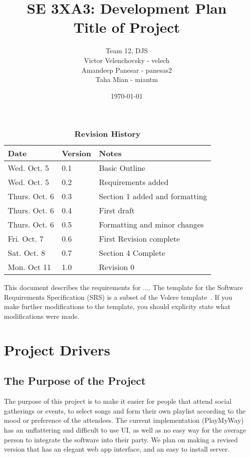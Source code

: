 \documentclass[12pt, titlepage]{article}
\title{SE 3XA3: Development Plan\\Title of Project}
\author{Team 12, DJS
	\\ Victor Velenchovsky - velech
	\\ Amandeep Panesar - panesas2
	\\ Taha Mian - miantm
}
\date{\today}
\begin{document}
\maketitle

\tableofcontents
\listoftables
\listoffigures

\begin{table}[bp]
\caption{\bf Revision History}
\begin{tabularx}{\textwidth}{p{3cm}p{2cm}X}
\toprule {\bf Date} & {\bf Version} & {\bf Notes}\\
\midrule
Wed. Oct. 5 & 0.1 & Basic Outline \\
Wed. Oct. 5 & 0.2 & Requirements added \\
Thurs. Oct. 6 & 0.3 & Section 1 added and formatting \\
Thurs. Oct. 6 & 0.4 & First draft \\
Thurs. Oct. 6 & 0.5 & Formatting and minor changes \\
Fri. Oct. 7 & 0.6 & First Revision complete \\
Sat. Oct. 8 & 0.7 & Section 4 Complete\\
Mon. Oct 11 & 1.0 & Revision 0\\
\bottomrule
\end{tabularx}
\end{table}

\newpage


This document describes the requirements for ....  The template for the Software
Requirements Specification (SRS) is a subset of the Volere
template~\citep{RobertsonAndRobertson2012}.  If you make further modifications
to the template, you should explicity state what modifications were made.

\section{Project Drivers}

\subsection{The Purpose of the Project}
The purpose of this project is to make it easier for people that attend social
gatherings or events, to select songs and form their own playlist according to
the mood or preference of the attendees. The current implementation (PlayMyWay)
has an unflattering and difficult to use UI, as well as no easy way for the
average person to integrate the software into their party. We plan on making a
revised version that has an elegant web app interface, and an easy to install
server.
\end{document}
